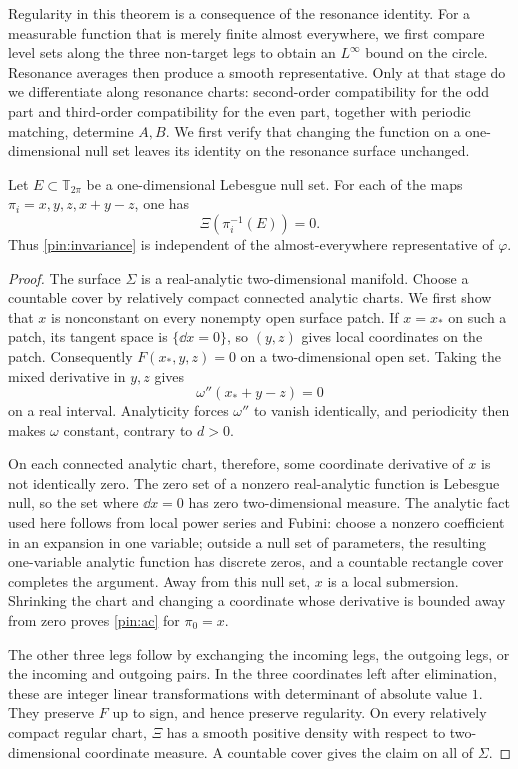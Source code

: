 Regularity in this theorem is a consequence of the resonance identity.
For a measurable function that is merely finite almost everywhere, we
first compare level sets along the three non-target legs to obtain an
$L^\infty$ bound on the circle. Resonance averages then produce a
smooth representative. Only at that stage do we differentiate along
resonance charts: second-order compatibility for the odd part and
third-order compatibility for the even part, together with periodic
matching, determine $A,B$. We first verify that changing the function
on a one-dimensional null set leaves its identity on the resonance
surface unchanged.

\begin{lemma}
\label{pin:leg-ac}
Let $E\subset\mathbb T_{2\pi}$ be a one-dimensional Lebesgue null set.
For each of the maps $\pi_i=x,y,z,x+y-z$, one has
\begin{equation}
                         \Xi(\pi_i^{-1}(E))=0.
 \label{pin:ac}
\end{equation}
Thus \eqref{pin:invariance} is independent of the almost-everywhere
representative of $\varphi$.
\end{lemma}

\begin{proof}
The surface $\Sigma$ is a real-analytic two-dimensional manifold.
Choose a countable cover by relatively compact connected analytic
charts. We first show that $x$ is nonconstant on every nonempty open
surface patch. If $x=x_*$ on such a patch, its tangent space is
$\{\dd x=0\}$, so $(y,z)$ gives local coordinates on the patch.
Consequently $F(x_*,y,z)=0$ on a two-dimensional open set. Taking the
mixed derivative in $y,z$ gives
\[
                   \omega''(x_*+y-z)=0
\]
on a real interval. Analyticity forces $\omega''$ to vanish identically,
and periodicity then makes $\omega$ constant, contrary to $d>0$.

On each connected analytic chart, therefore, some coordinate derivative
of $x$ is not identically zero. The zero set of a nonzero real-analytic
function is Lebesgue null, so the set where $\dd x=0$ has zero
two-dimensional measure. The analytic fact used here follows from local
power series and Fubini: choose a nonzero coefficient in an expansion
in one variable; outside a null set of parameters, the resulting
one-variable analytic function has discrete zeros, and a countable
rectangle cover completes the argument. Away from this null set,
$x$ is a local submersion. Shrinking the chart and changing a coordinate
whose derivative is bounded away from zero proves \eqref{pin:ac} for
$\pi_0=x$.

The other three legs follow by exchanging the incoming legs, the
outgoing legs, or the incoming and outgoing pairs. In the three
coordinates left after elimination, these are integer linear
transformations with determinant of absolute value $1$. They preserve
$F$ up to sign, and hence preserve regularity. On every relatively
compact regular chart, $\Xi$ has a smooth positive density with respect
to two-dimensional coordinate measure. A countable cover gives the
claim on all of $\Sigma$.
\end{proof}

